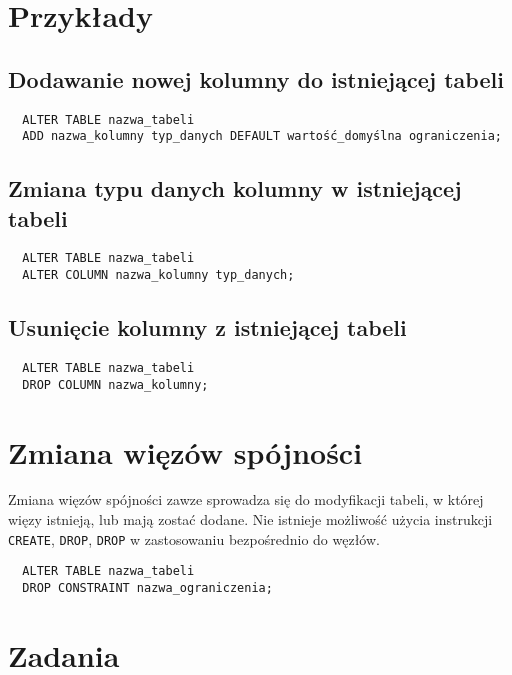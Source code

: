 \documentclass{article}
\begin{document}
\section{Przykłady}

\subsection{Dodawanie nowej kolumny do istniejącej tabeli}

\begin{verbatim}
  ALTER TABLE nazwa_tabeli
  ADD nazwa_kolumny typ_danych DEFAULT wartość_domyślna ograniczenia;
\end{verbatim}

\subsection{Zmiana typu danych kolumny w istniejącej tabeli}

\begin{verbatim}
  ALTER TABLE nazwa_tabeli
  ALTER COLUMN nazwa_kolumny typ_danych;
\end{verbatim}

\subsection{Usunięcie kolumny z istniejącej tabeli}

\begin{verbatim}
  ALTER TABLE nazwa_tabeli
  DROP COLUMN nazwa_kolumny;
\end{verbatim}

\section{Zmiana więzów spójności}

Zmiana więzów spójności zawze sprowadza się do modyfikacji tabeli, w której więzy istnieją,
lub mają zostać dodane. Nie istnieje możliwość użycia instrukcji \texttt{CREATE},
\texttt{DROP}, \texttt{DROP} w zastosowaniu bezpośrednio do węzłów.

\begin{verbatim}
  ALTER TABLE nazwa_tabeli
  DROP CONSTRAINT nazwa_ograniczenia;
\end{verbatim}

\section{Zadania}
\end{document}
